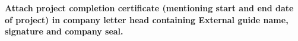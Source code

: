 \thispagestyle{empty}
\textbf{Attach project completion certificate (mentioning start and end date of project) in company letter head containing External guide name, signature and company seal.}